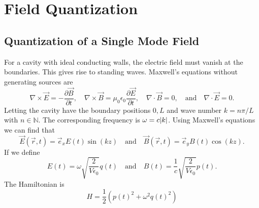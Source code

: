 \section{Field Quantization}
\subsection{Quantization of a Single Mode Field}
For a cavity with ideal conducting walls, the electric field must vanish at the boundaries. This gives rise to standing waves. Maxwell's equations without generating sources are
\begin{equation}
    \nabla \times \vec{E} = - \frac{\partial \vec{B}}{\partial t}, \quad \nabla \times \vec{B} = \mu_0 \epsilon_0\frac{\partial \vec{E}}{\partial t}, \quad \nabla \cdot \vec{B} = 0, \quad \text{and}\quad  \nabla \cdot \vec{E} = 0.
\end{equation}
Letting the cavity have the boundary positions $0,L$ and wave number $k = n\pi/L$ with $n\in\mathbb{N}$. The corresponding frequency is $\omega = c\abs{k}$. Using Maxwell's equations we can find that 
\begin{equation}
    \vec{E}(\vec{r}, t) = \vec{e}_x E(t) \sin(kz) \quad\text{and}\quad \vec{B}(\vec{r}, t) = \vec{e}_y B(t) \cos(kz).
\end{equation}
If we define 
\begin{equation}
    E(t) = \omega \sqrt{\frac{2}{V\epsilon_0}}q(t) \quad\text{and}\quad B(t) = \frac{1}{c} \sqrt{\frac{2}{V\epsilon_0}} p(t).
\end{equation}
The Hamiltonian is 
\begin{equation}
    H = \frac{1}{2} (p(t)^2 + \omega^2 q(t)^2)
\end{equation}

